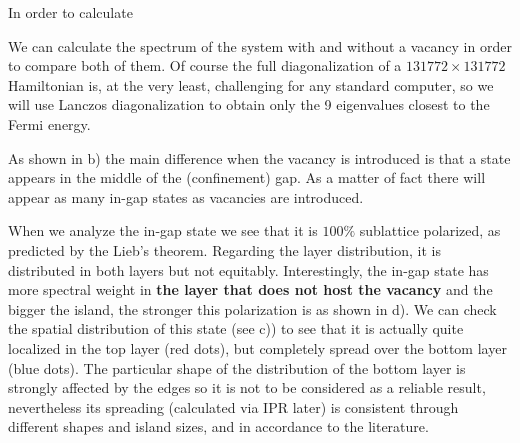 In order to calculate

We can calculate the spectrum of the system with and without a vacancy in order to compare both of them. Of course the full diagonalization of a $131772\times131772$ Hamiltonian is, at the very least, challenging for any standard computer, so we will use Lanczos diagonalization\cite{Lanczos1950, Ojalvo1970, Arnoldi1951} to obtain only the 9 eigenvalues closest to the Fermi energy.

As shown in b) the main difference when the vacancy is introduced is that a state appears in the middle of the (confinement) gap. As a matter of fact there will appear as many in-gap states as vacancies are introduced.

When we analyze the in-gap state we see that it is $100\%$ sublattice polarized, as predicted by the Lieb's theorem\cite{Lieb1989}. Regarding the layer distribution, it is distributed in both layers but not equitably. Interestingly, the in-gap state has more spectral weight in \textbf{the layer that does not host the vacancy} and the bigger the island, the stronger this polarization is as shown in d).
We can check the spatial distribution of this state (see c)) to see that it is actually quite localized in the top layer (red dots), but completely spread over the bottom layer (blue dots). The particular shape of the distribution of the bottom layer is strongly affected by the edges so it is not to be considered as a reliable result, nevertheless its spreading (calculated via IPR later) is consistent through different shapes and island sizes, and in accordance to the literature\cite{Castro2010}.



